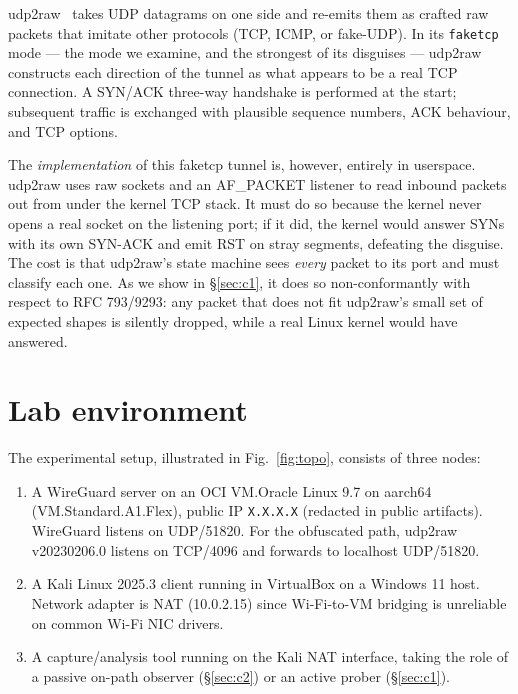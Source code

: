 \documentclass[conference]{IEEEtran}
\begin{document}
udp2raw~\cite{udp2raw} takes UDP datagrams on one side and re-emits them as
crafted raw packets that imitate other protocols (TCP, ICMP, or fake-UDP).
In its \texttt{faketcp} mode --- the mode we examine, and the strongest of
its disguises --- udp2raw constructs each direction of the tunnel as what
appears to be a real TCP connection. A SYN/ACK three-way handshake is
performed at the start; subsequent traffic is exchanged with plausible
sequence numbers, ACK behaviour, and TCP options.

The \emph{implementation} of this faketcp tunnel is, however, entirely in
userspace. udp2raw uses raw sockets and an AF\_PACKET listener to read
inbound packets out from under the kernel TCP stack. It must do so because
the kernel never opens a real socket on the listening port; if it did, the
kernel would answer SYNs with its own SYN-ACK and emit RST on stray
segments, defeating the disguise. The cost is that udp2raw's state machine
sees \emph{every} packet to its port and must classify each one. As we
show in \S\ref{sec:c1}, it does so non-conformantly with respect to RFC
793/9293: any packet that does not fit udp2raw's small set of expected
shapes is silently dropped, while a real Linux kernel would have answered.

\section{Lab environment}
\label{sec:lab}

The experimental setup, illustrated in Fig.~\ref{fig:topo}, consists of
three nodes:

\begin{enumerate}
  \item A WireGuard server on an OCI VM.\@ Oracle Linux 9.7 on aarch64
        (VM.Standard.A1.Flex), public IP \texttt{X.X.X.X} (redacted in
        public artifacts). WireGuard listens on UDP/51820. For the
        obfuscated path, udp2raw v20230206.0 listens on TCP/4096 and
        forwards to localhost UDP/51820.
  \item A Kali Linux 2025.3 client running in VirtualBox on a Windows 11
        host. Network adapter is NAT (10.0.2.15) since Wi-Fi-to-VM
        bridging is unreliable on common Wi-Fi NIC drivers.
  \item A capture/analysis tool running on the Kali NAT interface, taking
        the role of a passive on-path observer (\S\ref{sec:c2}) or an
        active prober (\S\ref{sec:c1}).
\end{enumerate}
\end{document}
